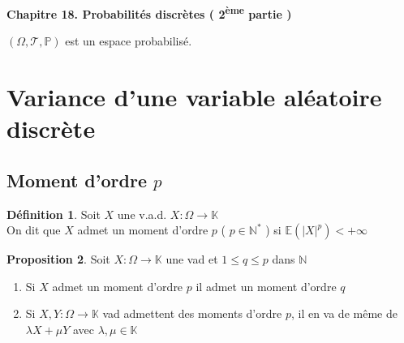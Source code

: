 \documentclass[10pt,a4paper]{article}
\theoremstyle{definition}
\newtheorem{proposition}{Proposition}[section]
\newtheorem{definition}[proposition]{Définition}
\begin{document}
\renewcommand{\labelitemi}{\textbullet}

\begin{center}
{\Large \textbf{Chapitre 18. Probabilités discrètes ( 2\textsuperscript{ème} partie )}}
\end{center}
\noindent \((\Omega, \mathcal{T}, \mathbb{P})\) est un espace probabilisé.

\section{Variance d'une variable aléatoire discrète}
\subsection{Moment d'ordre \(p\)}
\begin{definition}
    Soit \(X\) une v.a.d. \(X: \Omega \to \mathbb{K}\) \\
    On dit que \(X\) admet un moment d'ordre \(p\) ( \(p \in \mathbb{N}^*\) ) si \(\mathbb{E}\left(|X|^p\right) < +\infty\)
\end{definition}
\begin{proposition}
    Soit \(X: \Omega \to \mathbb{K}\) une vad et \(1 \leq q \leq p\) dans \(\mathbb{N}\)
    \begin{enumerate}
        \item Si \(X\) admet un moment d'ordre \(p\) il admet un moment d'ordre \(q\)
        \item Si \(X, Y: \Omega \to \mathbb{K}\) vad admettent des moments d'ordre \(p\), il en va de même de \(\lambda X + \mu Y\) avec \(\lambda, \mu \in \mathbb{K}\)
    \end{enumerate}
\end{proposition}
\end{document}
